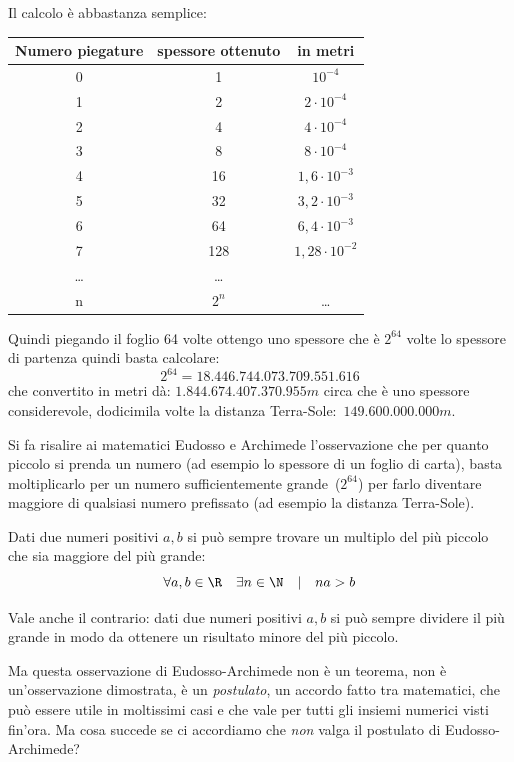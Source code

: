 Il calcolo è abbastanza semplice:

\begin{center}
 \begin{tabular}{ccc}
\toprule
Numero piegature & spessore ottenuto & in metri\\
\midrule
0 & 1 & \(10^{-4}\)\\
1 & 2 & \(2 \cdot 10^{-4}\)\\
2 & 4 & \(4 \cdot 10^{-4}\)\\
3 & 8 & \(8 \cdot 10^{-4}\)\\
4 & 16 & \(1,6 \cdot 10^{-3}\)\\
5 & 32 & \(3,2 \cdot 10^{-3}\)\\
6 & 64 & \(6,4 \cdot 10^{-3}\)\\
7 & 128 & \(1,28 \cdot 10^{-2}\)\\
\ldots& \ldots\\
n & \(2^n\) & \ldots\\
\bottomrule
\end{tabular}
\end{center}

Quindi piegando il foglio 64 volte ottengo uno spessore che è \(2^{64}\) 
volte lo spessore di partenza quindi basta calcolare:
\[2^{64} = 18.446.744.073.709.551.616\]
che convertito in metri dà: \(1.844.674.407.370.955m\) circa che è uno 
spessore considerevole, dodicimila volte la distanza 
Terra-Sole:~\(149.600.000.000m\).

Si fa risalire ai matematici Eudosso e Archimede l'osservazione che per 
quanto piccolo si prenda un numero (ad esempio lo spessore di un foglio di 
carta), basta moltiplicarlo per un numero sufficientemente 
grande~(\(2^{64}\)) per farlo diventare maggiore di qualsiasi numero 
prefissato (ad esempio la distanza Terra-Sole).

\begin{postulato}
Dati due numeri positivi \(a, b\) si può sempre trovare un 
multiplo del più piccolo che sia maggiore del più grande:
\[\forall a, b \in \R \quad \exists n \in \N \quad | \quad na>b\]
\end{postulato}

Vale anche il contrario: 
dati due numeri positivi \(a, b\) si può sempre dividere il più grande 
in modo da ottenere un risultato minore del più piccolo.

Ma questa osservazione di Eudosso-Archimede non è un teorema, non è 
un'osservazione dimostrata, è un \emph{postulato}, un accordo fatto tra 
matematici, che può essere utile in moltissimi casi e che vale per tutti gli 
insiemi numerici visti fin'ora. 
Ma cosa succede se ci accordiamo che \emph{non} valga il postulato di 
Eudosso-Archimede?

